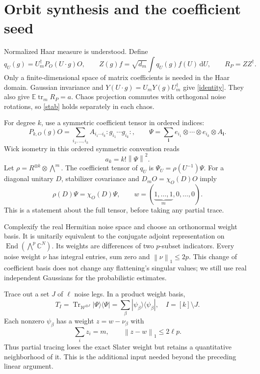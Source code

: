 \documentclass[11pt]{article}
\newcommand{\E}{\mathbb E}
\newcommand{\Tr}{\operatorname{Tr}}
\newcommand{\tr}{\operatorname{tr}}
\newcommand{\WW}{\mathcal W}
\newcommand{\dd}{\mathrm d}
\newcommand{\norm}[1]{\left\lVert#1\right\rVert}
\begin{document}
\newpage
\section{Orbit synthesis and the coefficient seed}
Normalized Haar measure is understood. Define
\begin{equation}\label{synthesis}
 q_U(g)=U_m^\dagger P_O(U\cdot g)O,\qquad
 Z(g)f=\sqrt{d_m}\int q_U(g)f(U)\,\dd U,\qquad R_P=ZZ^\dagger.
\end{equation}
Only a finite-dimensional space of matrix coefficients is needed in the
Haar domain. Gaussian invariance and $Y(U\cdot g)=U_mY(g)U_m^\dagger$
give \eqref{identity}. They also give $\E\tr_m R_P=a$.
Chaos projection commutes with orthogonal noise rotations, so
\eqref{stab} holds separately in each chaos.

For degree $k$, use a symmetric coefficient tensor in ordered indices:
\begin{equation}\label{seed}
 P_{k,O}(g)O=\sum_{i_1,\ldots,i_k} A_{i_1\cdots i_k}
 :g_{i_1}\cdots g_{i_k}:,\qquad
 \Psi=\sum_{\boldsymbol i}e_{i_1}\otimes\cdots\otimes e_{i_k}
                     \otimes A_{\boldsymbol i}.
\end{equation}
Wick isometry in this ordered symmetric convention reads
\begin{equation}\label{isometry}
 a_k=k!\norm{\Psi}^2.
\end{equation}
Let $\rho=R^{\otimes k}\otimes\bigwedge^m$. The coefficient tensor
of $q_U$ is $\Psi_U=\rho(U^{-1})\Psi$. For a diagonal unitary $D$,
stabilizer covariance and $D_mO=\chi_O(D)O$ imply
\begin{equation}\label{weight}
 \rho(D)\Psi=\chi_O(D)\Psi,\qquad
 w=(\underbrace{1,\ldots,1}_{m},0,\ldots,0).
\end{equation}
This is a statement about the full tensor, before taking any partial
trace.

Complexify the real Hermitian noise space and choose an orthonormal
weight basis. It is unitarily equivalent to the conjugate adjoint
representation on $\operatorname{End}(\bigwedge^p\mathbb C^N)$.
Its weights are differences of two $p$-subset indicators. Every noise
weight $\nu$ has integral entries, sum zero and $\norm{\nu}_1\le2p$.
This change of coefficient basis does not change any flattening's
singular values; we still use real independent Gaussians for the
probabilistic estimates.

Trace out a set $J$ of $\ell$ noise legs. In a product weight basis,
\begin{equation}\label{partial}
 T_I=\Tr_{\WW^{\otimes J}}|\Psi\rangle\langle\Psi|
     =\sum_\beta|\psi_\beta\rangle\langle\psi_\beta|,
 \quad I=[k]\setminus J.
\end{equation}
Each nonzero $\psi_\beta$ has a weight $z=w-\nu_\beta$ with
\begin{equation}\label{near}
 \sum_i z_i=m,\qquad\norm{z-w}_1\le2\ell p.
\end{equation}
Thus partial tracing loses the exact Slater weight but retains a
quantitative neighborhood of it. This is the additional input needed
beyond the preceding linear argument.
\end{document}
